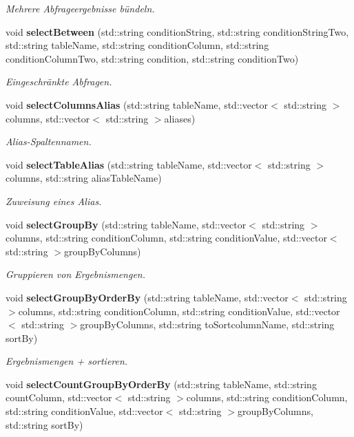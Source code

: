 \begin{DoxyCompactItemize}
\begin{DoxyCompactList}\small\item\em Mehrere Abfrageergebnisse bündeln. \end{DoxyCompactList}\item 
void \textbf{ select\+Between} (std\+::string condition\+String, std\+::string condition\+String\+Two, std\+::string table\+Name, std\+::string condition\+Column, std\+::string condition\+Column\+Two, std\+::string condition, std\+::string condition\+Two)
\begin{DoxyCompactList}\small\item\em Eingeschränkte Abfragen. \end{DoxyCompactList}\item 
void \textbf{ select\+Columns\+Alias} (std\+::string table\+Name, std\+::vector$<$ std\+::string $>$columns, std\+::vector$<$ std\+::string $>$aliases)
\begin{DoxyCompactList}\small\item\em Alias-\/\+Spaltennamen. \end{DoxyCompactList}\item 
void \textbf{ select\+Table\+Alias} (std\+::string table\+Name, std\+::vector$<$ std\+::string $>$columns, std\+::string alias\+Table\+Name)
\begin{DoxyCompactList}\small\item\em Zuweisung eines Alias. \end{DoxyCompactList}\item 
void \textbf{ select\+Group\+By} (std\+::string table\+Name, std\+::vector$<$ std\+::string $>$columns, std\+::string condition\+Column, std\+::string condition\+Value, std\+::vector$<$ std\+::string $>$group\+By\+Columns)
\begin{DoxyCompactList}\small\item\em Gruppieren von Ergebnismengen. \end{DoxyCompactList}\item 
void \textbf{ select\+Group\+By\+Order\+By} (std\+::string table\+Name, std\+::vector$<$ std\+::string $>$columns, std\+::string condition\+Column, std\+::string condition\+Value, std\+::vector$<$ std\+::string $>$group\+By\+Columns, std\+::string to\+Sortcolumn\+Name, std\+::string sort\+By)
\begin{DoxyCompactList}\small\item\em Ergebnismengen + sortieren. \end{DoxyCompactList}\item 
void \textbf{ select\+Count\+Group\+By\+Order\+By} (std\+::string table\+Name, std\+::string count\+Column, std\+::vector$<$ std\+::string $>$columns, std\+::string condition\+Column, std\+::string condition\+Value, std\+::vector$<$ std\+::string $>$group\+By\+Columns, std\+::string sort\+By)

\end{DoxyCompactItemize}
